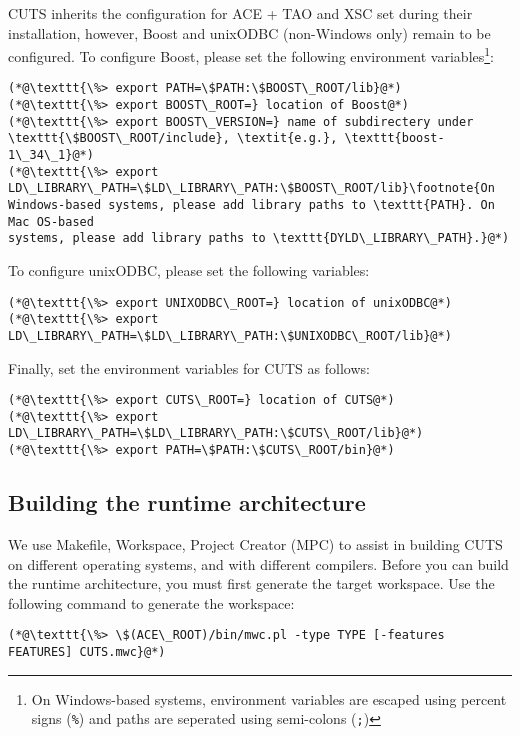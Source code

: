 CUTS inherits the configuration for ACE + TAO and XSC set during their installation,
however, Boost and unixODBC (non-Windows only) remain to be configured. To configure
Boost, please set the following environment variables\footnote{On Windows-based systems,
environment variables are escaped using percent signs (\texttt{\%}) and paths are 
seperated using semi-colons (\texttt{;})}:

\begin{lstlisting}
(*@\texttt{\%> export PATH=\$PATH:\$BOOST\_ROOT/lib}@*)
(*@\texttt{\%> export BOOST\_ROOT=} location of Boost@*)
(*@\texttt{\%> export BOOST\_VERSION=} name of subdirectery under \texttt{\$BOOST\_ROOT/include}, \textit{e.g.}, \texttt{boost-1\_34\_1}@*)
(*@\texttt{\%> export LD\_LIBRARY\_PATH=\$LD\_LIBRARY\_PATH:\$BOOST\_ROOT/lib}\footnote{On
Windows-based systems, please add library paths to \texttt{PATH}. On Mac OS-based
systems, please add library paths to \texttt{DYLD\_LIBRARY\_PATH}.}@*)
\end{lstlisting}

\noindent To configure unixODBC, please set the following variables:

\begin{lstlisting}
(*@\texttt{\%> export UNIXODBC\_ROOT=} location of unixODBC@*)
(*@\texttt{\%> export LD\_LIBRARY\_PATH=\$LD\_LIBRARY\_PATH:\$UNIXODBC\_ROOT/lib}@*)
\end{lstlisting}

\noindent Finally, set the environment variables for CUTS as follows:

\begin{lstlisting}
(*@\texttt{\%> export CUTS\_ROOT=} location of CUTS@*)
(*@\texttt{\%> export LD\_LIBRARY\_PATH=\$LD\_LIBRARY\_PATH:\$CUTS\_ROOT/lib}@*)
(*@\texttt{\%> export PATH=\$PATH:\$CUTS\_ROOT/bin}@*)
\end{lstlisting}

\subsection{Building the runtime architecture}

We use Makefile, Workspace, Project Creator (MPC) to assist in building CUTS
on different operating systems, and with different compilers. Before you can
build the runtime architecture, you must first generate the target workspace.
Use the following command to generate the workspace:

\begin{lstlisting}
(*@\texttt{\%> \$(ACE\_ROOT)/bin/mwc.pl -type TYPE [-features FEATURES] CUTS.mwc}@*)
\end{lstlisting}

